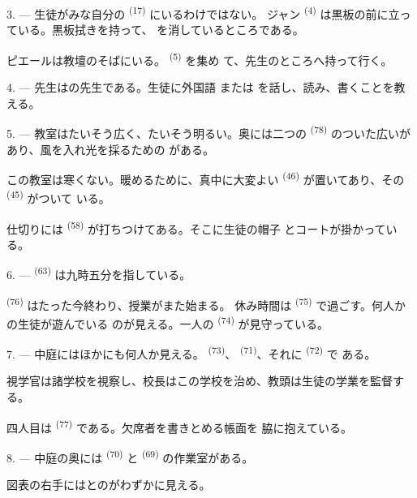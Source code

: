 3. --- 生徒がみな自分の \textsuperscript{(17)} にいるわけではない。
ジャン \textsuperscript{(4)} は黒板の前に立っている。黒板拭きを持って、
を消しているところである。

ピエールは教壇のそばにいる。 \textsuperscript{(5)} を集め
て、先生のところへ持って行く。

4. --- 先生はの先生である。生徒に外国語
または
を話し、読み、書くことを教える。

5. --- 教室はたいそう広く、たいそう明るい。奥には二つの
\textsuperscript{(78)} のついた広いがあり、風を入れ光を採るための
がある。

この教室は寒くない。暖めるために、真中に大変よい
\textsuperscript{(46)} が置いてあり、その \textsuperscript{(45)} がついて
いる。

仕切りには \textsuperscript{(58)} が打ちつけてある。そこに生徒の帽子
とコートが掛かっている。

\VUsaut{5.2mm}
\VUsaut{3.6mm}

6. ---  \textsuperscript{(63)} は九時五分を指している。

 \textsuperscript{(76)} はたった今終わり、授業がまた始まる。
休み時間は \textsuperscript{(75)} で過ごす。何人かの生徒が遊んでいる
のが見える。一人の \textsuperscript{(74)} が見守っている。

7. --- 中庭にはほかにも何人か見える。 \textsuperscript{(73)}、
 \textsuperscript{(71)}、それに \textsuperscript{(72)} で
ある。

視学官は諸学校を視察し、校長はこの学校を治め、教頭は生徒の学業を監督する。

四人目は \textsuperscript{(77)} である。欠席者を書きとめる帳面を
脇に抱えている。

8. --- 中庭の奥には \textsuperscript{(70)} と
\textsuperscript{(69)} の作業室がある。

図表の右手にはとのがわずかに見える。

